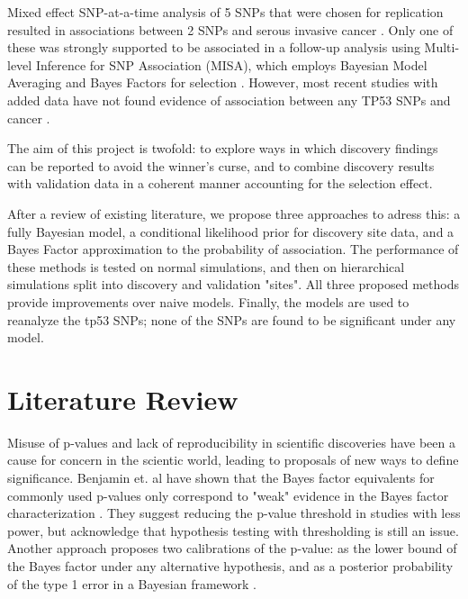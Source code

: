\documentclass[AMA,STIX1COL]{WileyNJD-v2}\usepackage[]{graphicx}\usepackage[]{color}
\begin{document}
Mixed effect SNP-at-a-time analysis of 5 SNPs that were chosen for replication resulted in associations between 2 SNPs and serous invasive cancer \cite{Schildkraut2349}. Only one of these was strongly supported to be associated in a follow-up analysis using Multi-level Inference for SNP Association (MISA), which employs Bayesian Model Averaging and Bayes Factors for selection \cite{schildkraut2010association}. However, most recent studies with added data have not found evidence of association between any TP53 SNPs and cancer \cite{phelan2017identification}.

The aim of this project is twofold: to explore ways in which discovery findings can be reported to avoid the winner's curse, and to combine discovery results with validation data in a coherent manner accounting for the selection effect. 

After a review of existing literature, we propose three approaches to adress this: a fully Bayesian model, a conditional likelihood prior for discovery site data, and a Bayes Factor approximation to the probability of association. The performance of these methods is tested on normal simulations, and then on hierarchical simulations split into discovery and validation "sites". All three proposed methods provide improvements over naive models. Finally, the models are used to reanalyze the tp53 SNPs; none of the SNPs are found to be significant under any model.

\section{Literature Review}\label{sec:lit}

Misuse of p-values and lack of reproducibility in scientific discoveries have been a cause for concern in the scientic world, leading to proposals of new ways to define significance. Benjamin et. al have shown that the Bayes factor equivalents for commonly used p-values only correspond to "weak" evidence in the Bayes factor characterization \cite{benjamin2017redefine}. They suggest reducing the p-value threshold in studies with less power, but acknowledge that hypothesis testing with thresholding is still an issue. Another approach proposes two calibrations of the p-value: as the lower bound of the Bayes factor under any alternative hypothesis, and as a posterior probability of the type 1 error in a Bayesian framework \cite{sellke2001calibration}.
\end{document}
